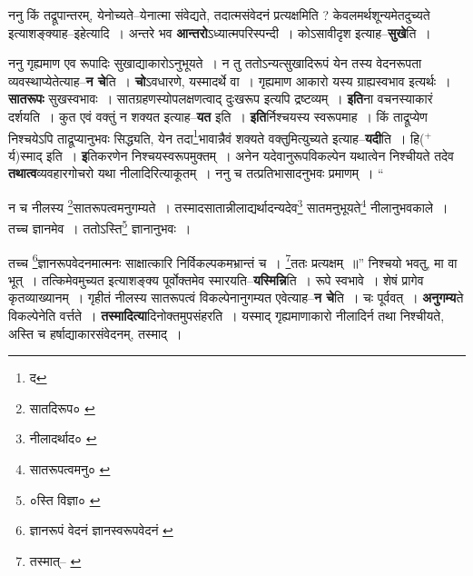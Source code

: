 \documentclass[article,12pt,a4paper]{memoir}
\newcommand{\add}[1]{($^{+}$#1)}
\begin{document}
	  \pstart ननु किं तद्रूपान्तरम्, येनोच्यते--येनात्मा संवेद्यते, तदात्मसंवेदनं प्रत्यक्षमिति ? केवलमर्थशून्यमेतदुच्यते इत्याशङ्क्याह--इहेत्यादि । अन्तरे भव \textbf{आन्तरो}ऽध्यात्मपरिस्पन्दी । कोऽसावीदृश इत्याह--\textbf{सुखे}ति ।
	\pend
      

	  \pstart ननु गृह्यमाण एव रूपादिः सुखाद्याकारोऽनुभूयते । न तु ततोऽन्यत्सुखादिरूपं येन तस्य वेदनरूपता व्यवस्थाप्येतेत्याह--\textbf{न चे}ति । \textbf{चो}ऽवधारणे, यस्मादर्थे वा । गृह्यमाण आकारो यस्य ग्राह्यस्वभाव इत्यर्थः । \textbf{सातरूपः} सुखस्वभावः । सातग्रहणस्योपलक्षणत्वाद् दुःखरूप इत्यपि द्रष्टव्यम् । \textbf{इति}ना वचनस्याकारं दर्शयति । कुत एवं वक्तुं न शक्यत इत्याह--\textbf{यत} इति । \textbf{इति}र्निश्चयस्य स्वरूपमाह । किं ताद्रूप्येण निश्चयेऽपि ताद्रूप्यानुभवः सिद्ध्यति, येन तदा\footnote{द}\-भावान्नैवं शक्यते वक्तुमित्युच्यते इत्याह--\textbf{यदी}ति । हि\add{र्य}स्माद् इति । \textbf{इ}तिकरणेन निश्चयस्वरूपमुक्तम् । अनेन यदेवानुरूपविकल्पेन यथात्वेन निश्चीयते तदेव \textbf{तथात्व}व्यवहारगोचरो यथा नीलादिरित्याकूतम् । ननु च तत्प्रतिभासादनुभवः प्रमाणम् ।  \leavevmode{} “
	  
	न च नीलस्य \footnote{सातदिरूप० \cite{dp-msC}}\-सातरूपत्वमनुगम्यते । तस्मादसातान्नीलाद्यर्थादन्यदेव\footnote{नीलादर्थाद० \cite{dp-msC} \cite{dp-msD}} सातमनुभूयते\footnote{सातरूपत्वमनु० \cite{dp-msD}} नीलानुभवकाले । तच्च ज्ञानमेव । ततोऽस्ति\footnote{०स्ति विज्ञा० \cite{dp-msD}} ज्ञानानुभवः । 
	  
	तच्च \footnote{ज्ञानरूपं वेदनं \cite{dp-msA} \cite{dp-msB} \cite{dp-edP} \cite{dp-edH} \cite{dp-edE} \cite{dp-edN} ज्ञानस्वरूपवेदनं \cite{dp-msC} \cite{dp-msD}}\-ज्ञानरूपवेदनमात्मनः साक्षात्कारि निर्विकल्पकमभ्रान्तं च । \footnote{तस्मात्--\cite{dp-msA} \cite{dp-msB} \cite{dp-msC} \cite{dp-edP} \cite{dp-edE} \cite{dp-edH} \cite{dp-edN}}\-ततः प्रत्यक्षम् ॥” निश्चयो भवतु, मा वा भूत् । तत्किमेवमुच्यत इत्याशङ्क्य पूर्वोक्तमेव स्मारयति--\textbf{यस्मिन्नि}ति । रूपे स्वभावे । शेषं प्रागेव कृतव्याख्यानम् । गृहीतं नीलस्य सातरूपत्वं विकल्पेनानुगम्यत एवेत्याह--\textbf{न चे}ति । चः पूर्ववत् । \textbf{अनुगम्य}ते विकल्पेनेति वर्त्तते । \textbf{तस्मादित्या}दिनोक्तमुपसंहरति । यस्माद् गृह्यमाणाकारो नीलादिर्न तथा निश्चीयते, अस्ति च हर्षाद्याकारसंवेदनम्, तस्माद् ।
	\pend
      
\end{document}
